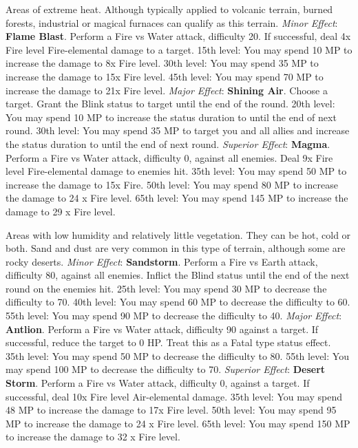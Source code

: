 \begin{multicols}{2}
    \ferrum

    Areas of extreme heat. Although typically applied to volcanic terrain, burned forests, industrial or magical furnaces can qualify as this terrain.
	\textit{Minor Effect}: \textbf{Flame Blast}. Perform a Fire vs Water attack, difficulty 20. If successful, deal 4x Fire level Fire-elemental damage to a target. 15th level: You may spend 10 MP to increase the damage to 8x Fire level. 30th level: You may spend 35 MP to increase the damage to 15x Fire level. 45th level: You may spend 70 MP to increase the damage to 21x Fire level.
	\textit{Major Effect}: \textbf{Shining Air}. Choose a target. Grant the Blink status to target until the end of the round. 20th level: You may spend 10 MP to increase the status duration to until the end of next round. 30th level: You may spend 35 MP to target you and all allies and increase the status duration to until the end of next round.
	\textit{Superior Effect}: \textbf{Magma}. Perform a Fire vs Water attack, difficulty 0, against all enemies. Deal 9x Fire level Fire-elemental damage to enemies hit. 35th level: You may spend 50 MP to increase the damage to 15x Fire. 50th level: You may spend 80 MP to increase the damage to 24 x Fire level. 65th level: You may spend 145 MP to increase the damage to 29 x Fire level.

    \ferrum

    Areas with low humidity and relatively little vegetation. They can be hot, cold or both. Sand and dust are very common in this type of terrain, although some are rocky deserts.
	\textit{Minor Effect}: \textbf{Sandstorm}. Perform a Fire vs Earth attack, difficulty 80, against all enemies. Inflict the Blind status until the end of the next round on the enemies hit. 25th level: You may spend 30 MP to decrease the difficulty to 70. 40th level: You may spend 60 MP to decrease the difficulty to 60. 55th level: You may spend 90 MP to decrease the difficulty to 40.
	\textit{Major Effect}: \textbf{Antlion}. Perform a Fire vs Water attack, difficulty 90 against a target. If successful, reduce the target to 0 HP. Treat this as a Fatal type status effect. 35th level: You may spend 50 MP to decrease the difficulty to 80. 55th level: You may spend 100 MP to decrease the difficulty to 70.
	\textit{Superior Effect}: \textbf{Desert Storm}. Perform a Fire vs Water attack, difficulty 0, against a target. If successful, deal 10x Fire level Air-elemental damage. 35th level: You may spend 48 MP to increase the damage to 17x Fire level. 50th level: You may spend 95 MP to increase the damage to 24 x Fire level. 65th level: You may spend 150 MP to increase the damage to 32 x Fire level.


\end{multicols}
